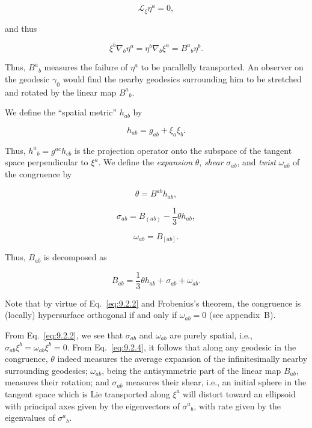 \begin{equation}
  \mathcal L_{\xi}\eta^a=0 ,
  \tag{9.2.3}\label{eq:9.2.3}
\end{equation}

and thus

\begin{equation}
  \xi^b\nabla_b\eta^a
  =\eta^b\nabla_b\xi^a
  =B^a{}_b\eta^b .
  \tag{9.2.4}\label{eq:9.2.4}
\end{equation}

Thus, \(B^a{}_b\) measures the failure of \(\eta^a\) to be parallelly transported. An
observer on the geodesic \(\gamma_0\) would find the nearby geodesics surrounding him
to be stretched and rotated by the linear map \(B^a{}_b\).

We define the ``spatial metric'' \(h_{ab}\) by

\begin{equation}
  h_{ab}=g_{ab}+\xi_a\xi_b .
  \tag{9.2.5}\label{eq:9.2.5}
\end{equation}

Thus, \(h^a{}_b=g^{ac}h_{cb}\) is the projection operator onto the subspace of the
tangent space perpendicular to \(\xi^a\). We define the \emph{expansion} \(\theta\), \emph{shear}
\(\sigma_{ab}\), and \emph{twist} \(\omega_{ab}\) of the congruence by

\begin{equation}
  \theta=B^{ab}h_{ab} ,
  \tag{9.2.6}\label{eq:9.2.6}
\end{equation}

\begin{equation}
  \sigma_{ab}=B_{(ab)}-\frac13\theta h_{ab} ,
  \tag{9.2.7}\label{eq:9.2.7}
\end{equation}

\begin{equation}
  \omega_{ab}=B_{[ab]} .
  \tag{9.2.8}\label{eq:9.2.8}
\end{equation}

Thus, \(B_{ab}\) is decomposed as

\begin{equation}
  B_{ab}=\frac13\theta h_{ab}+\sigma_{ab}+\omega_{ab} .
  \tag{9.2.9}\label{eq:9.2.9}
\end{equation}

Note that by virtue of Eq.~\eqref{eq:9.2.2} and Frobenius's theorem, the congruence is
(locally) hypersurface orthogonal if and only if \(\omega_{ab}=0\) (see appendix~B).

From Eq.~\eqref{eq:9.2.2}, we see that \(\sigma_{ab}\) and \(\omega_{ab}\) are purely spatial,
i.e., \(\sigma_{ab}\xi^b=\omega_{ab}\xi^b=0\). From Eq.~\eqref{eq:9.2.4}, it follows that
along any geodesic in the congruence, \(\theta\) indeed measures the average expansion
of the infinitesimally nearby surrounding geodesics; \(\omega_{ab}\), being the
antisymmetric part of the linear map \(B_{ab}\), measures their rotation; and
\(\sigma_{ab}\) measures their shear, i.e., an initial sphere in the tangent space which is
Lie transported along \(\xi^a\) will distort toward an ellipsoid with principal axes given
by the eigenvectors of \(\sigma^a{}_b\), with rate given by the eigenvalues of
\(\sigma^a{}_b\).

